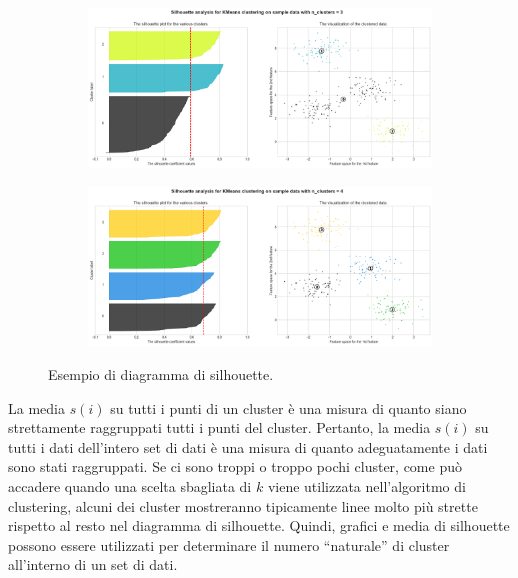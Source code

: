 \begin{figure}
      \centering
      \begin{subfigure}[b]{0.6\textwidth}
            \centering
            \includegraphics[width=\textwidth]{img/cluster/silhouette1.png}
            \caption{}
            \label{fig:silhouette1}
      \end{subfigure}
      \hfill
      \begin{subfigure}[b]{0.6\textwidth}
            \centering
            \includegraphics[width=\textwidth]{img/cluster/silhouette2.png}
            \caption{}
            \label{fig:silhouette2}
      \end{subfigure}
      \caption{Esempio di diagramma di silhouette.}
      \label{fig:silhouette}
\end{figure}
La media $s(i)$ su tutti i punti di un cluster è una misura di quanto siano
strettamente raggruppati tutti i punti del cluster. Pertanto, la media $s(i)$ su
tutti i dati dell'intero set di dati è una misura di quanto adeguatamente i dati
sono stati raggruppati. Se ci sono troppi o troppo pochi cluster, come può
accadere quando una scelta sbagliata di $k$ viene utilizzata nell'algoritmo di
clustering, alcuni dei cluster mostreranno tipicamente linee molto più strette
rispetto al resto nel diagramma di silhouette. Quindi, grafici e media di
silhouette possono essere utilizzati per determinare il numero “naturale” di
cluster all'interno di un set di dati.

